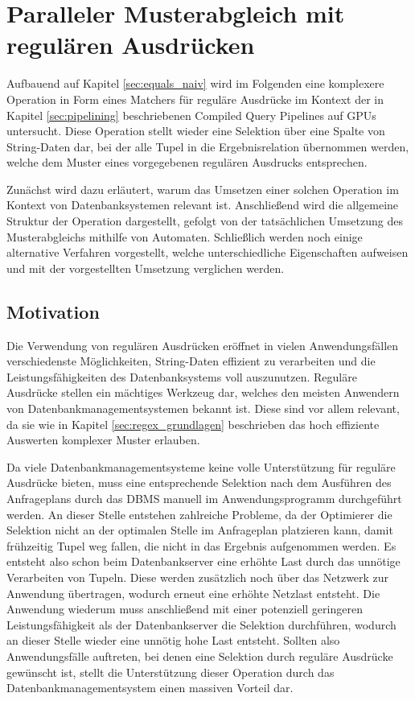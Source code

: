 \chapter{Paralleler Musterabgleich mit regulären Ausdrücken}

Aufbauend auf Kapitel \ref{sec:equals_naiv} wird im Folgenden eine komplexere Operation in Form eines Matchers für reguläre Ausdrücke im Kontext der in Kapitel \ref{sec:pipelining} beschriebenen Compiled Query Pipelines auf GPUs untersucht.
Diese Operation stellt wieder eine Selektion über eine Spalte von String-Daten dar, bei der alle Tupel in die Ergebnisrelation übernommen werden, welche dem Muster eines vorgegebenen regulären Ausdrucks entsprechen.

Zunächst wird dazu erläutert, warum das Umsetzen einer solchen Operation im Kontext von Datenbanksystemen relevant ist.
Anschließend wird die allgemeine Struktur der Operation dargestellt, gefolgt von der tatsächlichen Umsetzung des Musterabgleichs mithilfe von Automaten.
Schließlich werden noch einige alternative Verfahren vorgestellt, welche unterschiedliche Eigenschaften aufweisen und mit der vorgestellten Umsetzung verglichen werden.

\section{Motivation}

Die Verwendung von regulären Ausdrücken eröffnet in vielen Anwendungsfällen verschiedenste Möglichkeiten, String-Daten effizient zu verarbeiten und die Leistungsfähigkeiten des Datenbanksystems voll auszunutzen.
Reguläre Ausdrücke stellen ein mächtiges Werkzeug dar, welches den meisten Anwendern von Datenbankmanagementsystemen bekannt ist.
Diese sind vor allem relevant, da sie wie in Kapitel \ref{sec:regex_grundlagen} beschrieben das hoch effiziente Auswerten komplexer Muster erlauben.

Da viele Datenbankmanagementsysteme keine volle Unterstützung für reguläre Ausdrücke bieten, muss eine entsprechende Selektion nach dem Ausführen des Anfrageplans durch das DBMS manuell im Anwendungsprogramm durchgeführt werden.
An dieser Stelle entstehen zahlreiche Probleme, da der Optimierer die Selektion nicht an der optimalen Stelle im Anfrageplan platzieren kann, damit frühzeitig Tupel weg fallen, die nicht in das Ergebnis aufgenommen werden.
Es entsteht also schon beim Datenbankserver eine erhöhte Last durch das unnötige Verarbeiten von Tupeln.
Diese werden zusätzlich noch über das Netzwerk zur Anwendung übertragen, wodurch erneut eine erhöhte Netzlast entsteht.
Die Anwendung wiederum muss anschließend mit einer potenziell geringeren Leistungsfähigkeit als der Datenbankserver die Selektion durchführen, wodurch an dieser Stelle wieder eine unnötig hohe Last entsteht.
Sollten also Anwendungsfälle auftreten, bei denen eine Selektion durch reguläre Ausdrücke gewünscht ist, stellt die Unterstützung dieser Operation durch das Datenbankmanagementsystem einen massiven Vorteil dar.

